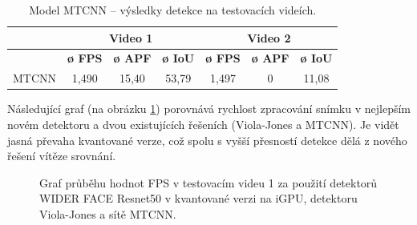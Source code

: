 \begin{table}[H]
  \centering
  \begin{tabular}{c|ccc|ccc|}
  \cline{2-7}
                                                               & \multicolumn{3}{c|}{\cellcolor[HTML]{CBCEFB}\textbf{Video 1}}                                                                              & \multicolumn{3}{c|}{\cellcolor[HTML]{CBCEFB}\textbf{Video 2}}                                                                              \\ \hline
  \rowcolor[HTML]{E0DBDB} 
  \multicolumn{1}{|c|}{\cellcolor[HTML]{E0DBDB}\textbf{Model}} & \multicolumn{1}{c|}{\cellcolor[HTML]{E0DBDB}\textbf{ø FPS}} & \multicolumn{1}{c|}{\cellcolor[HTML]{E0DBDB}\textbf{ø APF}} & \textbf{ø IoU} & \multicolumn{1}{c|}{\cellcolor[HTML]{E0DBDB}\textbf{ø FPS}} & \multicolumn{1}{c|}{\cellcolor[HTML]{E0DBDB}\textbf{ø APF}} & \textbf{ø IoU} \\ \hline
  \multicolumn{1}{|c|}{\cellcolor[HTML]{E0DBDB}MTCNN}          & \multicolumn{1}{c|}{1,490}                                  & \multicolumn{1}{c|}{15,40}                                  & 53,79          & \multicolumn{1}{c|}{1,497}                                  & \multicolumn{1}{c|}{0}                                      & 11,08          \\ \hline
  \end{tabular}
  \label{tabulka:mtcnnvidea}
  \caption{Model MTCNN -- výsledky detekce na testovacích videích.}
\end{table}

\noindent Následující graf (na obrázku \ref{obrazek:porovnanifps}) porovnává rychlost zpracování snímku v nejlepším novém detektoru a dvou existujících řešeních (Viola-Jones a MTCNN). Je vidět jasná převaha kvantované verze, což spolu s vyšší přesností detekce dělá z nového řešení vítěze srovnání.

\begin{figure}[H] 
  \begin{center}
  \label{obrazek:porovnanifps}
  \caption{Graf průběhu hodnot FPS v testovacím videu 1 za použití detektorů WIDER FACE Resnet50 v kvantované verzi na iGPU, detektoru Viola-Jones a sítě MTCNN.}
  \end{center}
\end{figure}

